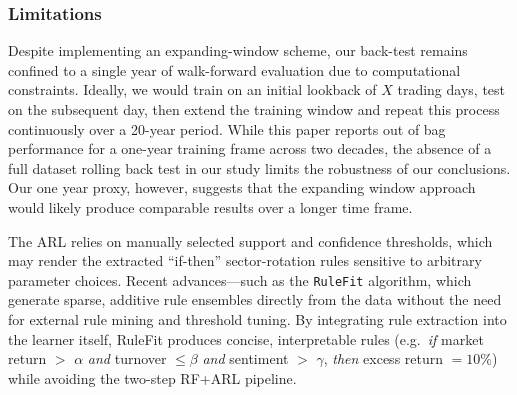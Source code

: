 \subsubsection{Limitations}


Despite implementing an expanding-window scheme, our back-test remains confined to a single year of walk-forward evaluation due to computational constraints. Ideally, we would train on an initial lookback of $X$ trading days, test on the subsequent day, then extend the training window and repeat this process continuously over a 20-year period. While this paper reports out of bag performance for a one-year training frame across two decades, the absence of a full dataset rolling back test in our study limits the robustness of our conclusions. Our one year proxy, however, suggests that the expanding window approach would likely produce comparable results over a longer time frame.

The ARL relies on manually selected support and confidence thresholds, which may render the extracted “if-then” sector-rotation rules sensitive to arbitrary parameter choices. Recent advances—such as the \texttt{RuleFit} algorithm, which generate sparse, additive rule ensembles directly from the data without the need for external rule mining and threshold tuning. By integrating rule extraction into the learner itself, RuleFit produces concise, interpretable rules (e.g.\ \emph{if} market return $>$ $\alpha$ \emph{and} turnover $\le \beta$ \emph{and} sentiment $>$ $\gamma$, \emph{then} excess return $=10\%$) while avoiding the two-step RF+ARL pipeline.

